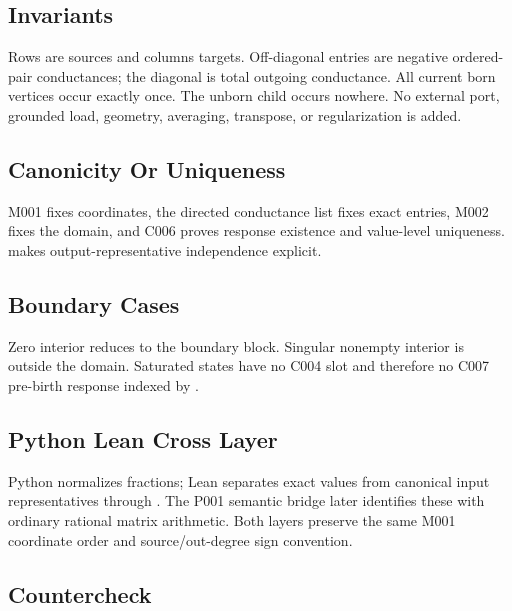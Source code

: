 \subsection{Invariants}\label{invariants-8}

Rows are sources and columns targets. Off-diagonal entries are negative
ordered-pair conductances; the diagonal is total outgoing conductance.
All current born vertices occur exactly once. The unborn child occurs
nowhere. No external port, grounded load, geometry, averaging,
transpose, or regularization is added.

\subsection{Canonicity Or Uniqueness}\label{canonicity-or-uniqueness-8}

M001 fixes coordinates, the directed conductance list fixes exact
entries, M002 fixes the domain, and C006 proves response existence and
value-level uniqueness. \texttt{\protect{}} makes
output-representative independence explicit.

\subsection{Boundary Cases}\label{boundary-cases-8}

Zero interior reduces to the boundary block. Singular nonempty interior
is outside the domain. Saturated states have no C004 slot and therefore
no C007 pre-birth response indexed by \texttt{\protect{}}.

\subsection{Python Lean Cross Layer}\label{python-lean-cross-layer-8}

Python normalizes fractions; Lean separates exact values from canonical
\texttt{\protect{}} input representatives through \texttt{\protect{}}.
The P001 semantic bridge later identifies these with ordinary rational
matrix arithmetic. Both layers preserve the same M001 coordinate order
and source/out-degree sign convention.

\subsection{Countercheck}\label{countercheck-8}

